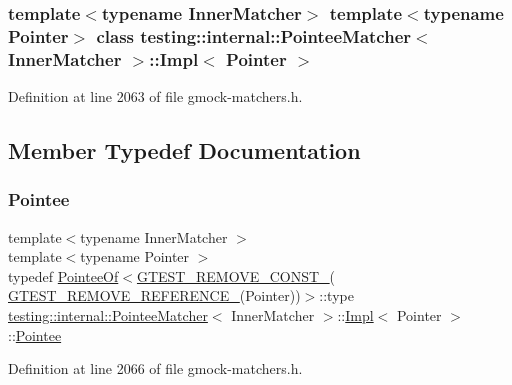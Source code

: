 \subsubsection*{template$<$typename Inner\+Matcher$>$\newline
template$<$typename Pointer$>$\newline
class testing\+::internal\+::\+Pointee\+Matcher$<$ Inner\+Matcher $>$\+::\+Impl$<$ Pointer $>$}



Definition at line 2063 of file gmock-\/matchers.\+h.



\subsection{Member Typedef Documentation}
\mbox{\label{classtesting_1_1internal_1_1PointeeMatcher_1_1Impl_af28def7caaa864201e03f6fcd54a841b}} 
\subsubsection{\texorpdfstring{Pointee}{Pointee}}
{\footnotesize\ttfamily template$<$typename Inner\+Matcher $>$ \\
template$<$typename Pointer $>$ \\
typedef \hyperlink{structtesting_1_1internal_1_1PointeeOf}{Pointee\+Of}$<$\hyperlink{gtest-internal_8h_a2ffec8c60510eb130af387f5ce9a756a}{G\+T\+E\+S\+T\+\_\+\+R\+E\+M\+O\+V\+E\+\_\+\+C\+O\+N\+S\+T\+\_\+}( \hyperlink{gtest-internal_8h_a84c72f25a6a6600e3ff8381ca6982ae9}{G\+T\+E\+S\+T\+\_\+\+R\+E\+M\+O\+V\+E\+\_\+\+R\+E\+F\+E\+R\+E\+N\+C\+E\+\_\+}(Pointer))$>$\+::type \hyperlink{classtesting_1_1internal_1_1PointeeMatcher}{testing\+::internal\+::\+Pointee\+Matcher}$<$ Inner\+Matcher $>$\+::\hyperlink{classtesting_1_1internal_1_1PointeeMatcher_1_1Impl}{Impl}$<$ Pointer $>$\+::\hyperlink{classtesting_1_1internal_1_1PointeeMatcher_1_1Impl_af28def7caaa864201e03f6fcd54a841b}{Pointee}}



Definition at line 2066 of file gmock-\/matchers.\+h.



